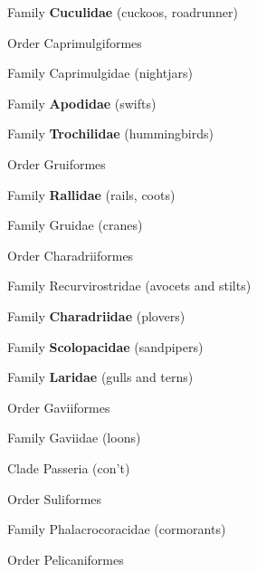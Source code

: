 \documentclass[10pt]{article}
\newlength\mylength
\newcommand*{\growparindent}{\addtolength{\parindent}{\mylength}}
\newcommand*{\reduceparindent}{\addtolength{\parindent}{-1\mylength}}
\begin{document}
\begin{multicols}{2}
\begin{spacing}{1.35}
    	  Family \textbf{Cuculidae} (cuckoos, roadrunner)
    	  
    	\reduceparindent
    	
    	Order Caprimulgiformes
    	
    		\growparindent
    		
    		Family Caprimulgidae (nightjars)
    		
    		Family \textbf{Apodidae} (swifts)
    		
    		Family \textbf{Trochilidae} (hummingbirds)
    		
    	\reduceparindent
    	
    	Order Gruiformes
    	
    	\growparindent
    	
    		Family \textbf{Rallidae} (rails, coots)
    		
    		Family Gruidae (cranes)
    		
    	\reduceparindent
    	
    	Order Charadriiformes
    	
    		\growparindent
    		
    		Family Recurvirostridae (avocets and stilts)
    		
    		Family \textbf{Charadriidae} (plovers)
    		
    		Family \textbf{Scolopacidae} (sandpipers)
    		
    		Family \textbf{Laridae} (gulls and terns)
    		
    	\reduceparindent
    	
    	Order Gaviiformes
    	
    		\growparindent
    		
    		Family Gaviidae (loons)
\columnbreak

	\reduceparindent
	
	\reduceparindent
      
      
    Clade Passeria (con't)
      
      \growparindent
      
      Order Suliformes
      
      	\growparindent
      
      	Family Phalacrocoracidae (cormorants)
      	
      \reduceparindent
      
      Order Pelicaniformes
      
      	\growparindent
      	

\end{spacing}
\end{multicols}
\end{document}
